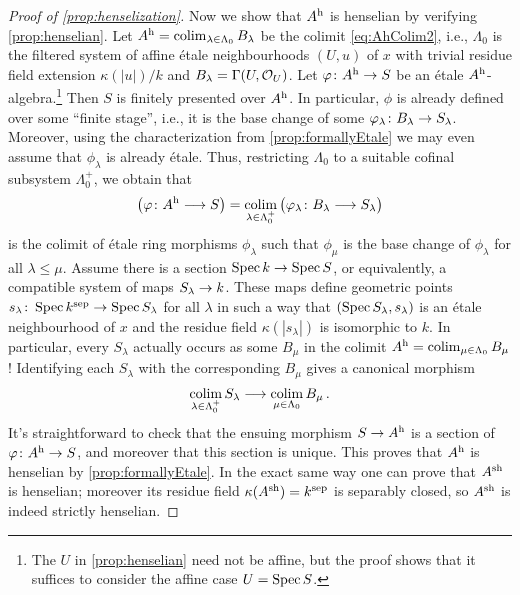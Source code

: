 \documentclass[a4paper, 10pt, oneside, DIV=9, chapterprefix=true, numbers=enddot, bibliography=totoc]{scrbook}
\begin{document}
\begin{proof}[Proof of \cref{prop:henselization}]
	Now we show that $A^{\mathrm{h}}$ is henselian by verifying \cref{prop:henselian}. Let $A^{\mathrm{h}}=\operatorname*{colim}_{\lambda\in\Lambda_0}B_\lambda$ be the colimit \cref{eq:AhColim2}, i.e., $\Lambda_0$ is the filtered system of affine étale neighbourhoods $(U,u)$ of $x$ with trivial residue field extension $\kappa(|u|)/k$ and $B_\lambda=\operatorname{\Gamma}(U,\mathcal{O}_U)$. Let $\phi\colon A^\h\morphism S$ be an étale $A^{\mathrm{h}}$-algebra.\footnote{The $U$ in \cref{prop:henselian} need not be affine, but the proof shows that it suffices to consider the affine case $U=\operatorname{Spec} S$.} Then $S$ is finitely presented over $A^{\mathrm{h}}$. In particular, $\phi$ is already defined over some \enquote{finite stage}, i.e., it is the base change of some $\phi_\lambda\colon B_\lambda\morphism S_\lambda$. Moreover, using the characterization from \cref{prop:formallyEtale} we may even assume that $\phi_\lambda$ is already étale. Thus, restricting $\Lambda_0$ to a suitable cofinal subsystem $\Lambda_0^+$, we obtain that 
	\begin{equation*}
		\left(\phi\colon A^\h\morphism S\right)=\colimit_{\lambda\in\Lambda_0^+}\big(\phi_\lambda\colon B_\lambda\morphism S_\lambda\big)
	\end{equation*}
	is the colimit of étale ring morphisms $\phi_\lambda$ such that $\phi_\mu$ is the base change of $\phi_\lambda$ for all $\lambda\leq \mu$. Assume there is a section $\Spec k\morphism \Spec S$, or equivalently, a compatible system of maps $S_\lambda\morphism k$. These maps define geometric points $s_\lambda\colon \Spec k^\sep \morphism\Spec S_\lambda$ for all $\lambda$ in such a way that $(\operatorname{Spec} S_\lambda,s_\lambda)$ is an étale neighbourhood of $x$ and the residue field $\kappa(|s_\lambda|)$ is isomorphic to $k$. In particular, every $S_\lambda$ actually occurs as some $B_\mu$ in the colimit $A^{\mathrm{h}}=\operatorname*{colim}_{\mu\in\Lambda_0}B_\mu$! Identifying each $S_\lambda$ with the corresponding $B_\mu$ gives a canonical morphism
	\begin{equation*}
		\colimit_{\lambda\in\Lambda_0^+}S_\lambda \morphism \colimit_{\mu\in\Lambda_0}B_\mu\,.
	\end{equation*}
	It's straightforward to check that the ensuing morphism $S\morphism A^\h$ is a section of $\phi\colon A^\h\morphism S$, and moreover that this section is unique. This proves that $A^{\mathrm{h}}$ is henselian by \cref{prop:formallyEtale}. In the exact same way one can prove that $A^{\mathrm{sh}}$ is henselian; moreover its residue field $\kappa(A^{\mathrm{sh}})=k^{\mathrm{sep}}$ is separably closed, so $A^{\mathrm{sh}}$ is indeed strictly henselian.
	

\end{proof}
\end{document}
